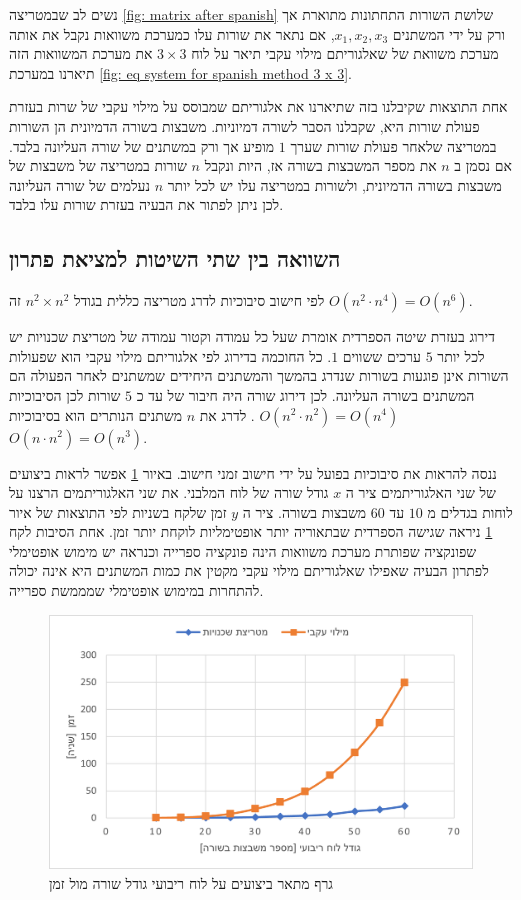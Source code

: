 \documentclass[12pt,leqno]{article}
\theoremstyle{theoremdd}
\begin{document}
נשים לב שבמטריצה 
\ref{fig: matrix after spanish}
שלושת השורות התחתונות מתוארת אך ורק על 
ידי 
המשתנים 
$x_1, x_2, x_3$,
אם נתאר את שורות עלו כמערכת משוואות נקבל
את אותה מערכת משוואת של 
שאלגוריתם מילוי עקבי תיאר על לוח 
$3 \times 3$
את מערכת המשוואות הזה תיארנו 
במערכת
\ref{fig: eq system for spanish method 3 x 3}.

אחת התוצאות שקיבלנו בזה שתיארנו את אלגוריתם שמבוסס על מילוי עקבי של שרות 
בעזרת פעולת שורות היא, שקבלנו הסבר לשורה דמיוניות.
משבצות בשורה הדמיונית 
הן השורות במטריצה
שלאחר פעולת שורות 
שערך
$1$
מופיע אך ורק במשתנים של שורה העליונה בלבד.
אם נסמן ב
$n$
את מספר המשבצות בשורה אז,
היות ונקבל 
$n$
שורות במטריצה של משבצות של משבצות בשורה הדמיונית,
ולשורות במטריצה עלו יש לכל יותר 
$n$
נעלמים של שורה העליונה לכן ניתן לפתור את הבעיה 
בעזרת
שורות עלו בלבד.

\subsection{השוואה בין שתי השיטות למציאת פתרון}
לפי חישוב סיבוכיות
לדרג מטריצה 
כללית
בגודל 
$n^2 \times n^2$
זה 
$O(n^2 \cdot n^4) = O(n^6)$.

דירוג בעזרת שיטה הספרדית אומרת
שעל כל עמודה 
וקטור עמודה 
של מטריצת שכנויות
יש לכל יותר
$5$
ערכים ששווים 
$1$.
כל החוכמה בדירוג לפי אלגוריתם מילוי עקבי הוא 
שפעולות השורות
אינן פוגעות בשורות 
שנדרג בהמשך והמשתנים היחידים שמשתנים לאחר הפעולה הם המשתנים בשורה העליונה.
לכן דירוג שורה היה חיבור 
של עד כ
$5$
שורות
לכן הסיבוכיות 
$O(n^2 \cdot n^2) = O(n^4)$
.
לדרג את
$n$
משתנים  
הנותרים
הוא בסיבוכיות 
$O(n \cdot n^2) = O (n^3)$.

ננסה להראות את סיבוכיות בפועל על ידי חישוב זמני חישוב.
באיור 
\ref{fig:prefofmance_diagram}
אפשר לראות ביצועים
של שני האלגוריתמים ציר 
ה
$x$
גודל שורה של לוח המלבני.
את שני האלגוריתמים
הרצנו על 
לוחות בגדלים 
מ
$10$
עד 
$60$
משבצות
בשורה.
ציר ה
$y$
זמן שלקח 
בשניות
לפי התוצאות של איור 
\ref{fig:prefofmance_diagram}
ניראה 
שגישה הספרדית שבתאוריה יותר אופטימליות לוקחת יותר זמן.
אחת הסיבות לקח 
שפונקציה שפותרת מערכת משוואות הינה פונקציה ספרייה
וכנראה יש מימוש אופטימלי לפתרון הבעיה שאפילו 
שאלגוריתם מילוי עקבי מקטין את כמות 
המשתנים היא אינה יכולה להתחרות במימוש אופטימלי שמממשת ספרייה.

\begin{figure}[ht]
    \caption{ 
    גרף מתאר ביצועים על לוח ריבועי גודל שורה מול זמן
    }
    \label{fig:prefofmance_diagram}
    \centering
    \includegraphics{images/benchmark.png}
\end{figure}
\end{document}
